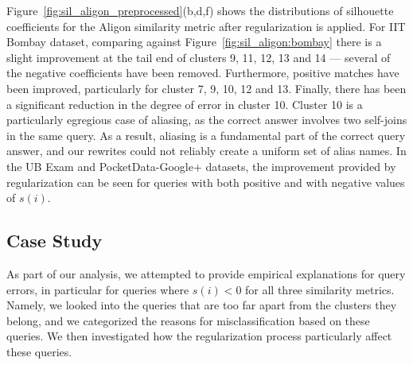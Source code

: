 Figure~\ref{fig:sil_aligon_preprocessed}(b,d,f) shows the distributions of silhouette coefficients for the Aligon similarity metric after regularization is applied.  
For IIT Bombay dataset, comparing against Figure~\ref{fig:sil_aligon:bombay} there is a slight improvement at the tail end of clusters 9, 11, 12, 13 and 14 --- several of the negative coefficients have been removed.  
Furthermore, positive matches have been improved, particularly for cluster 7, 9, 10, 12 and 13.  
Finally, there has been a significant reduction in the degree of error in cluster 10.  Cluster 10 is a particularly egregious case of aliasing, as the correct answer involves two self-joins in the same query.  As a result, aliasing is a fundamental part of the correct query answer, and our rewrites could not reliably create a uniform set of alias names.
In the UB Exam and PocketData-Google+ datasets, the improvement provided by regularization can be seen for queries with both positive and with negative values of $s(i)$.


\subsection{Case Study}


As part of our analysis, we attempted to provide empirical explanations for query errors, in particular for queries where $s(i) < 0$ for all three similarity metrics. Namely, we looked into the queries that are too far apart from the clusters they belong, and we categorized the reasons for misclassification based on these queries. We then investigated how the regularization process particularly affect these queries. 

